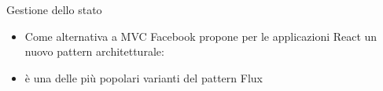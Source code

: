     \begin{frame}{\insertsectionhead}{\insertsubsectionhead}
      \begin{block}{Gestione dello stato}
        \begin{itemize}
          \item<1-> Come alternativa a MVC Facebook propone per le applicazioni React un nuovo pattern architetturale: 
          \item<2->  è una delle più popolari varianti del pattern Flux
        \end{itemize}
      \end{block}

      \begin{figure}
        \centering
      \end{figure}
    \end{frame}

